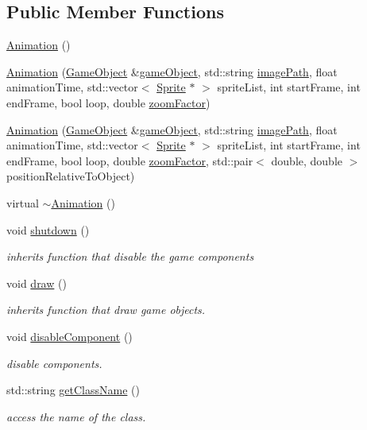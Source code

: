 \subsection*{Public Member Functions}
\begin{DoxyCompactItemize}
\item 
\hyperlink{classengine_1_1_animation_a83f0a16cef7117f187ad596de38dd9d6}{Animation} ()
\item 
\hyperlink{classengine_1_1_animation_acc7e1092278297d6e029031115d147a6}{Animation} (\hyperlink{classengine_1_1_game_object}{Game\+Object} \&\hyperlink{classengine_1_1_component_ad4a4865ca4df98ebea34d04a4ec5ad07}{game\+Object}, std\+::string \hyperlink{classengine_1_1_background_component_aeffcb1aa8b67444e004413dee8c266b1}{image\+Path}, float animation\+Time, std\+::vector$<$ \hyperlink{classengine_1_1_sprite}{Sprite} $\ast$ $>$ sprite\+List, int start\+Frame, int end\+Frame, bool loop, double \hyperlink{classengine_1_1_image_component_aa27852286227a84dc9c9f01c9fe2add8}{zoom\+Factor})
\item 
\hyperlink{classengine_1_1_animation_a3bca75a5859165a3944d01efde626a2d}{Animation} (\hyperlink{classengine_1_1_game_object}{Game\+Object} \&\hyperlink{classengine_1_1_component_ad4a4865ca4df98ebea34d04a4ec5ad07}{game\+Object}, std\+::string \hyperlink{classengine_1_1_background_component_aeffcb1aa8b67444e004413dee8c266b1}{image\+Path}, float animation\+Time, std\+::vector$<$ \hyperlink{classengine_1_1_sprite}{Sprite} $\ast$ $>$ sprite\+List, int start\+Frame, int end\+Frame, bool loop, double \hyperlink{classengine_1_1_image_component_aa27852286227a84dc9c9f01c9fe2add8}{zoom\+Factor}, std\+::pair$<$ double, double $>$ position\+Relative\+To\+Object)
\item 
virtual \hyperlink{classengine_1_1_animation_a401b68793d4fbf48d481c030ee4b2a16}{$\sim$\+Animation} ()
\item 
void \hyperlink{classengine_1_1_animation_a219053e2c5bc9179fa355f14cf9bf032}{shutdown} ()
\begin{DoxyCompactList}\small\item\em inherits function that disable the game components \end{DoxyCompactList}\item 
void \hyperlink{classengine_1_1_animation_a5bc1f5aaee0372f573d4537dab43a162}{draw} ()
\begin{DoxyCompactList}\small\item\em inherits function that draw game objects. \end{DoxyCompactList}\item 
void \hyperlink{classengine_1_1_animation_aed6b685cec9e13063f171ce6bd49b9d7}{disable\+Component} ()
\begin{DoxyCompactList}\small\item\em disable components. \end{DoxyCompactList}\item 
std\+::string \hyperlink{classengine_1_1_animation_a6d7f93578e25311f51f2b3c737f885b2}{get\+Class\+Name} ()
\begin{DoxyCompactList}\small\item\em access the name of the class. \end{DoxyCompactList}\end{DoxyCompactItemize}
